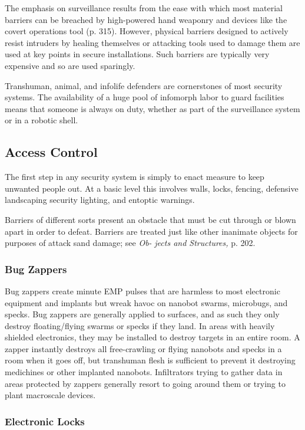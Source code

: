 The emphasis on surveillance results from the ease 
with which most material barriers can be breached 
by high-powered hand weaponry and devices like 
the covert operations tool (p. 315). However, physical
barriers designed to actively resist intruders by
healing themselves or attacking tools used to damage 
them are used at key points in secure installations. 
Such barriers are typically very expensive and so are 
used sparingly.

Transhuman, animal, and infolife defenders are 
cornerstones of most security systems. The availability
of a huge pool of infomorph labor to guard
facilities means that someone is always on duty, 
whether as part of the surveillance system or in a 
robotic shell.

\subsection{Access Control}

The first step in any security system is simply to enact 
measure to keep unwanted people out. At a basic level 
this involves walls, locks, fencing, defensive landscaping
security lighting, and entoptic warnings.

Barriers of different sorts present an obstacle that 
must be cut through or blown apart in order to 
defeat. Barriers are treated just like other inanimate 
objects for purposes of attack sand damage; see \textit{Ob-}
\textit{jects and Structures,} p. 202.

\subsubsection{Bug Zappers}

Bug zappers create minute EMP pulses that are harmless
to most electronic equipment and implants but
wreak havoc on nanobot swarms, microbugs, and 
specks. Bug zappers are generally applied to surfaces, 
and as such they only destroy floating/flying swarms 
or specks if they land. In areas with heavily shielded 
electronics, they may be installed to destroy targets 
in an entire room. A zapper instantly destroys all 
free-crawling or flying nanobots and specks in a room 
when it goes off, but transhuman flesh is sufficient to 
prevent it destroying medichines or other implanted 
nanobots. Infiltrators trying to gather data in areas 
protected by zappers generally resort to going around 
them or trying to plant macroscale devices.

\subsubsection{Electronic Locks}

